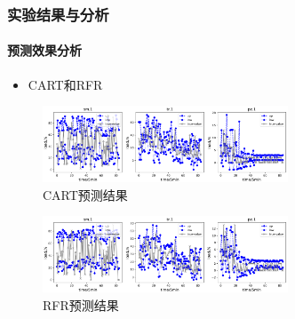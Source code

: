 \begin{frame}
\frametitle{实验结果与分析}
\framesubtitle{预测效果分析}
\begin{itemize}
    \item CART和RFR
\end{itemize}
\begin{minipage}{\textwidth}
    \centering
    \begin{figure}[htb]
    \centering
    \includegraphics[width=0.65\textwidth]{figures/fig12_d_cart.png}
    \caption{CART预测结果}
    \label{fig:fig12_d}
    \end{figure}
\end{minipage}
\begin{minipage}{\textwidth}
    \centering
    \begin{figure}[htb]
    \centering
    \includegraphics[width=0.65\textwidth]{figures/fig12_e_rfr.png}
    \caption{RFR预测结果}
    \label{fig:fig12_e}
    \end{figure}
\end{minipage}
\end{frame}

